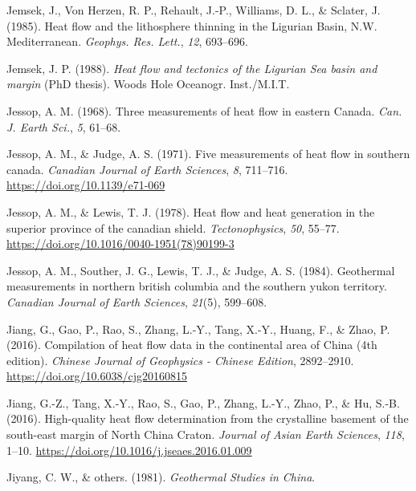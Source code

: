 \documentclass[draft,linenumbers]{agujournal2018}
\begin{document}
\leavevmode{}%
Jemsek, J., Von Herzen, R. P., Rehault, J.-P., Williams, D. L., \&
Sclater, J. (1985). Heat flow and the lithosphere thinning in the
{Ligurian Basin, N.W. Mediterranean}. \emph{Geophys. Res. Lett.},
\emph{12}, 693--696.

\leavevmode{}%
Jemsek, J. P. (1988). \emph{Heat flow and tectonics of the {Ligurian
Sea} basin and margin} (PhD thesis). Woods Hole Oceanogr. Inst./M.I.T.

\leavevmode{}%
Jessop, A. M. (1968). Three measurements of heat flow in eastern
{Canada}. \emph{Can. J. Earth Sci.}, \emph{5}, 61--68.

\leavevmode{}%
Jessop, A. M., \& Judge, A. S. (1971). Five measurements of heat flow in
southern canada. \emph{Canadian Journal of Earth Sciences}, \emph{8},
711--716. \url{https://doi.org/10.1139/e71-069}

\leavevmode{}%
Jessop, A. M., \& Lewis, T. J. (1978). Heat flow and heat generation in
the superior province of the canadian shield. \emph{Tectonophysics},
\emph{50}, 55--77. \url{https://doi.org/10.1016/0040-1951(78)90199-3}

\leavevmode{}%
Jessop, A. M., Souther, J. G., Lewis, T. J., \& Judge, A. S. (1984).
Geothermal measurements in northern british columbia and the southern
yukon territory. \emph{Canadian Journal of Earth Sciences},
\emph{21}(5), 599--608.

\leavevmode{}%
Jiang, G., Gao, P., Rao, S., Zhang, L.-Y., Tang, X.-Y., Huang, F., \&
Zhao, P. (2016). Compilation of heat flow data in the continental area
of {China} (4th edition). \emph{Chinese Journal of Geophysics - Chinese
Edition}, 2892--2910. \url{https://doi.org/10.6038/cjg20160815}

\leavevmode{}%
Jiang, G.-Z., Tang, X.-Y., Rao, S., Gao, P., Zhang, L.-Y., Zhao, P., \&
Hu, S.-B. (2016). High-quality heat flow determination from the
crystalline basement of the south-east margin of {North China Craton}.
\emph{Journal of Asian Earth Sciences}, \emph{118}, 1--10.
\url{https://doi.org/10.1016/j.jseaes.2016.01.009}

\leavevmode{}%
Jiyang, C. W., \& others. (1981). \emph{Geothermal Studies in China}.
\end{document}
